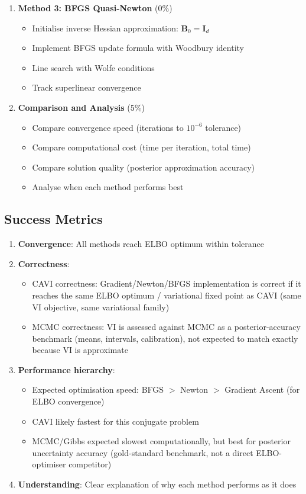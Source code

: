 \documentclass[11pt]{article}
\begin{document}
\begin{enumerate}[leftmargin=*]
\item \textbf{Method 3: BFGS Quasi-Newton} (0\%)
\begin{itemize}
\item Initialise inverse Hessian approximation: $\bm{B}_0 = \bm{I}_d$
\item Implement BFGS update formula with Woodbury identity
\item Line search with Wolfe conditions
\item Track superlinear convergence
\end{itemize}

\item \textbf{Comparison and Analysis} (5\%)
\begin{itemize}
\item Compare convergence speed (iterations to $10^{-6}$ tolerance)
\item Compare computational cost (time per iteration, total time)
\item Compare solution quality (posterior approximation accuracy)
\item Analyse when each method performs best
\end{itemize}
\end{enumerate}

\subsection*{Success Metrics}

\begin{enumerate}
\item \textbf{Convergence}: All methods reach ELBO optimum within tolerance
\item \textbf{Correctness}:
\begin{itemize}
\item CAVI correctness: Gradient/Newton/BFGS implementation is correct if it reaches the same ELBO optimum / variational fixed point as CAVI (same VI objective, same variational family)
\item MCMC correctness: VI is assessed against MCMC as a posterior-accuracy benchmark (means, intervals, calibration), not expected to match exactly because VI is approximate
\end{itemize}
\item \textbf{Performance hierarchy}:
\begin{itemize}
\item Expected optimisation speed: BFGS $>$ Newton $>$ Gradient Ascent (for ELBO convergence)
\item CAVI likely fastest for this conjugate problem
\item MCMC/Gibbs expected slowest computationally, but best for posterior uncertainty accuracy (gold-standard benchmark, not a direct ELBO-optimiser competitor)
\end{itemize}
\item \textbf{Understanding}: Clear explanation of why each method performs as it does
\end{enumerate}
\newpage
\end{document}
